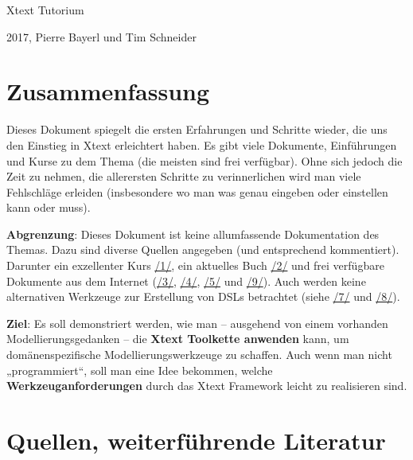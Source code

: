 \documentclass[]{article}
\date{}
\begin{document}
Xtext Tutorium

2017, Pierre Bayerl und Tim Schneider

\section[Zusammenfassung]{\texorpdfstring{\protect\hypertarget{anchor}{}{}Zusammenfassung}{Zusammenfassung}}\label{zusammenfassung}

Dieses Dokument spiegelt die ersten Erfahrungen und Schritte wieder, die
uns den Einstieg in Xtext erleichtert haben. Es gibt viele Dokumente,
Einführungen und Kurse zu dem Thema (die meisten sind frei verfügbar).
Ohne sich jedoch die Zeit zu nehmen, die allerersten Schritte zu
verinnerlichen wird man viele Fehlschläge erleiden (insbesondere wo man
was genau eingeben oder einstellen kann oder muss).

\textbf{Abgrenzung}: Dieses Dokument ist keine allumfassende
Dokumentation des Themas. Dazu sind diverse Quellen angegeben (und
entsprechend kommentiert). Darunter ein exzellenter Kurs
\protect\hyperlink{anchor-1}{/1/}, ein aktuelles Buch
\protect\hyperlink{anchor-2}{/2/} und frei verfügbare Dokumente aus dem
Internet (\protect\hyperlink{anchor-3}{/3/},
\protect\hyperlink{anchor-4}{/4/}, \protect\hyperlink{anchor-5}{/5/} und
\protect\hyperlink{anchor-6}{/9/}). Auch werden keine alternativen
Werkzeuge zur Erstellung von DSLs betrachtet (siehe
\protect\hyperlink{anchor-7}{/7/} und
\protect\hyperlink{anchor-8}{/8/}).

\textbf{Ziel}: Es soll demonstriert werden, wie man -- ausgehend von
einem vorhanden Modellierungsgedanken -- die \textbf{Xtext Toolkette
anwenden }kann, um domänenspezifische Modellierungswerkzeuge zu
schaffen. Auch wenn man nicht „programmiert``, soll man eine Idee
bekommen, welche \textbf{Werkzeuganforderungen }durch das Xtext
Framework leicht zu realisieren sind.

\section[Quellen, weiterführende
Literatur]{\texorpdfstring{\protect\hypertarget{anchor-9}{}{}\protect\hypertarget{anchor-10}{}{}Quellen,
weiterführende
Literatur}{Quellen, weiterführende Literatur}}\label{quellen-weiterfuxfchrende-literatur}
\end{document}
